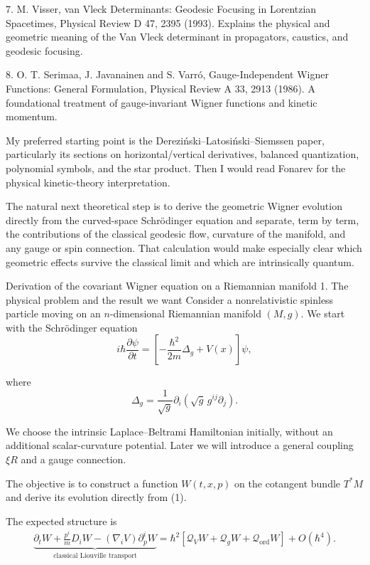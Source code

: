 7. M. Visser, van Vleck Determinants: Geodesic Focusing in Lorentzian Spacetimes, Physical Review D 47, 2395 (1993). Explains the physical and geometric meaning of the Van Vleck determinant in propagators, caustics, and geodesic focusing.

8. O. T. Serimaa, J. Javanainen and S. Varró, Gauge-Independent Wigner Functions: General Formulation, Physical Review A 33, 2913 (1986). A foundational treatment of gauge-invariant Wigner functions and kinetic momentum.

My preferred starting point is the Dereziński–Latosiński–Siemssen paper, particularly its sections on horizontal/vertical derivatives, balanced quantization, polynomial symbols, and the star product. Then I would read Fonarev for the physical kinetic-theory interpretation.

The natural next theoretical step is to derive the geometric Wigner evolution directly from the curved-space Schrödinger equation and separate, term by term, the contributions of the classical geodesic flow, curvature of the manifold, and any gauge or spin connection. That calculation would make especially clear which geometric effects survive the classical limit and which are intrinsically quantum.


Derivation of the covariant Wigner equation on a Riemannian manifold
1. The physical problem and the result we want
Consider a nonrelativistic spinless particle moving on an \(n\)-dimensional Riemannian manifold \((M,g)\). We start with the Schrödinger equation
\[
\boxed{
i\hbar\frac{\partial\psi}{\partial t}
=
\left[
-\frac{\hbar^2}{2m}\Delta_g+V(x)
\right]\psi,
}
\tag{1}
\]

where
\[
\Delta_g=
\frac{1}{\sqrt g}
\partial_i\left(\sqrt g\,g^{ij}\partial_j\right).
\tag{2}
\]

We choose the intrinsic Laplace–Beltrami Hamiltonian initially, without an additional scalar-curvature potential. Later we will introduce a general coupling \(\xi R\) and a gauge connection.

The objective is to construct a function \(W(t,x,p)\) on the cotangent bundle \(T^*M\) and derive its evolution directly from (1).

The expected structure is
\[
\boxed{
\begin{aligned}
\underbrace{\partial_tW+
\frac{p^i}{m}D_iW-
(\nabla_iV)\partial_p^iW}
_{\text{classical Liouville transport}}
=
\hbar^2
\left[
\mathcal Q_VW+
\mathcal Q_gW+
\mathcal Q_{\mathrm{ord}}W
\right]
+O(\hbar^4).
\end{aligned}
}
\tag{3}
\]

